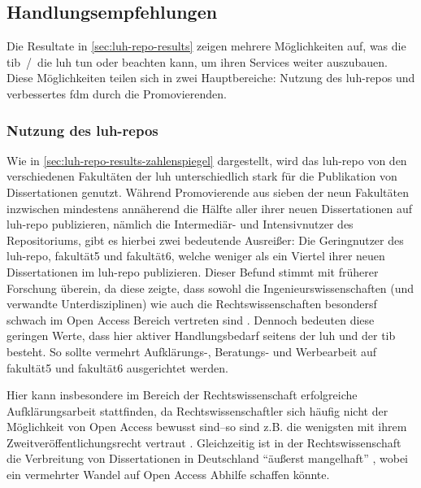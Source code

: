 \subsection{Handlungsempfehlungen}
Die Resultate in \cref{sec:luh-repo-results} zeigen mehrere Möglichkeiten auf, was die \gls{tib}~/~die \gls{luh} tun oder beachten kann, um ihren Services weiter auszubauen.
Diese Möglichkeiten teilen sich in zwei Hauptbereiche: Nutzung des \gls{luh-repo}s und verbessertes \gls{fdm} durch die Promovierenden.

\subsubsection{Nutzung des \gls{luh-repo}s}
Wie in \cref{sec:luh-repo-results-zahlenspiegel} dargestellt, wird das \gls{luh-repo} von den verschiedenen Fakultäten der \gls{luh} unterschiedlich stark für die Publikation von Dissertationen genutzt.
Während Promovierende aus sieben der neun Fakultäten inzwischen mindestens annäherend die Hälfte aller ihrer neuen Dissertationen auf \gls{luh-repo} publizieren, nämlich die Intermediär- und Intensivnutzer des Repositoriums, gibt es hierbei zwei bedeutende Ausreißer:
Die Geringnutzer des \gls{luh-repo}, \gls{fakultät5} und \gls{fakultät6}, welche weniger als ein Viertel ihrer neuen Dissertationen im \gls{luh-repo} publizieren.
Dieser Befund stimmt mit früherer Forschung überein, da diese zeigte, dass sowohl die Ingenieurswissenschaften (und verwandte Unterdisziplinen) wie auch die Rechtswissenschaften besondersf schwach im Open Access Bereich vertreten sind \autocite{Archambault2014,Piwowar2018,Severin2020-Jura,Hamann2019-OA,Fischer2022-Jura}.
Dennoch bedeuten diese geringen Werte, dass hier aktiver Handlungsbedarf seitens der \gls{luh} und der \gls{tib} besteht.
So sollte vermehrt Aufklärungs-, Beratungs- und Werbearbeit auf \gls{fakultät5} und \gls{fakultät6} ausgerichtet werden.

Hier kann insbesondere im Bereich der Rechtswissenschaft erfolgreiche Aufklärungsarbeit stattfinden, da Rechtswissenschaftler sich häufig nicht der Möglichkeit von Open Access bewusst sind--so sind z.B. die wenigsten mit ihrem Zweitveröffentlichungsrecht vertraut \autocite[91]{Eisentraut}.
Gleichzeitig ist in der Rechtswissenschaft die Verbreitung von Dissertationen in Deutschland \enquote{äußerst mangelhaft} \autocite[50]{Steinhauer2019-OA}, wobei ein vermehrter Wandel auf Open Access Abhilfe schaffen könnte.

